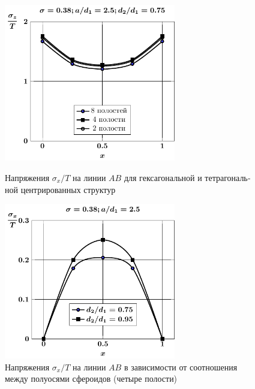 \begin{russian}
\begin{figure}[h!]
\centering\footnotesize
\parbox[b]{7.5cm}{\centering\includegraphics[width=7.5cm]{cav8-4-2-sig_z-spheroids.pdf}
\caption{Напряжения $\sigma_x/T$ на линии $AB$ для гексагональной и тетрагональной центрированных структур
\label{f:9:4}}}\hfil\hfil
\parbox[b]{7.5cm}{\centering\includegraphics[width=7.5cm]{cav4-d-sig_x.pdf}
\caption{Напряжения $\sigma_x/T$ на линии $AB$ в зависимости от соотношения между полуосями сфероидов (четыре полости)
\label{f:9:5}}}
\end{figure}

%


\end{russian}
